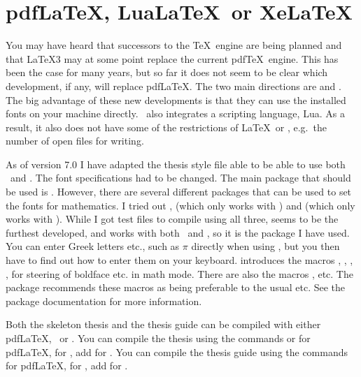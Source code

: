\section{pdf\LaTeX, Lua\LaTeX\ or Xe\LaTeX}%
\label{sec:package:xelatex}

You may have heard that successors to the \TeX\ engine are being planned
and that \LaTeX3 may at some point replace the current pdf\TeX\ engine.
This has been the case for many years,
but so far it does not seem to be clear
which development, if any, will replace pdf\LaTeX.
The two main directions are \LuaLaTeX and \XeLaTeX.
The big advantage of these new developments is that they can use the installed fonts on your machine directly.
\LuaLaTeX\ also integrates a scripting language, Lua.
As a result, it also does not have some of the restrictions of \LaTeX\ or \XeLaTeX,
e.g.\ the number of open files for writing.

As of version 7.0 I have adapted the thesis style file able to be able to use both \LuaLaTeX\ and \XeLaTeX.
The font specifications had to be changed.
The main package that should be used is .
However, there are several different packages that can be used to set the fonts for mathematics.
I tried out ,  (which only works with \LuaLaTeX)
and  (which only works with \XeLaTeX).
While I got test files to compile using all three,
 seems to be the furthest developed,
and works with both \LuaLaTeX\ and \XeLaTeX, so it is the package I have used.
You can enter Greek letters etc., such as \(\pi\) directly when using ,
but you then have to find out how to enter them on your keyboard.
 introduces the macros
, , , , 
for steering of boldface etc. in math mode.
There are also the macros ,  etc.
The package recommends these macros as being preferable to the usual  etc.
See the package documentation for more information.
 
Both the skeleton thesis and the thesis guide can be compiled with either pdf\LaTeX, \LuaLaTeX\ or \XeLaTeX.
You can compile the thesis using the commands  or  for pdf\LaTeX,
 for \LuaLaTeX, add
 for \XeLaTeX.
You can compile the thesis guide using the commands  for pdf\LaTeX,
 for \LuaLaTeX, add
 for \XeLaTeX.

